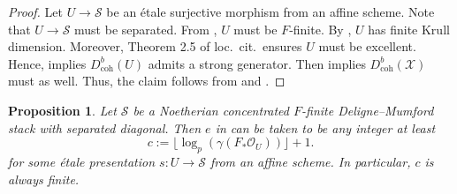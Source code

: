 \documentclass[11pt]{amsart}
\theoremstyle{plain}
\newtheorem{proposition}[theorem]{Proposition}
\theoremstyle{definition}
\numberwithin{equation}{section}
\numberwithin{theorem}{section}
\begin{document}
\begin{proof}
    Let $U \to \mathcal{S}$ be an \'{e}tale surjective morphism from an affine scheme. 
    Note that $U \to \mathcal{S}$ must be separated. 
    From , $U$ must be $F$-finite. By \cite[Proposition 1.1]{Kunz:1976}, $U$ has finite Krull dimension. Moreover, Theorem 2.5 of loc.\ cit.\ ensures $U$ must be excellent. Hence, \cite[Main Theorem]{Aoki:2021} implies $D^b_{\operatorname{coh}}(U)$ admits a strong generator. 
    Then \cite[Corollary 6.10]{DeDeyn/Lank/ManaliRahul:2025} implies $D^b_{\operatorname{coh}}(\mathcal{X})$ must as well. 
    Thus, the claim follows from  and \cite[\href{https://stacks.math.columbia.edu/tag/0FXA}{Tag 0FXA}]{stacks-project}.
\end{proof}

\begin{proposition}
    \label{prop:Frobenius_generation_bound}
    Let $\mathcal{S}$ be a Noetherian concentrated $F$-finite Deligne--Mumford stack with separated diagonal. 
    Then $e$ in  can be taken to be any integer at least
    \begin{displaymath}
        c:=\lfloor \log_p (\gamma (F_\ast \mathcal{O}_U )) \rfloor + 1.
    \end{displaymath}
    for some \'etale presentation $s\colon U\to \mathcal{S}$ from an affine scheme. 
    In particular, $c$ is always finite.
\end{proposition}
\end{document}
